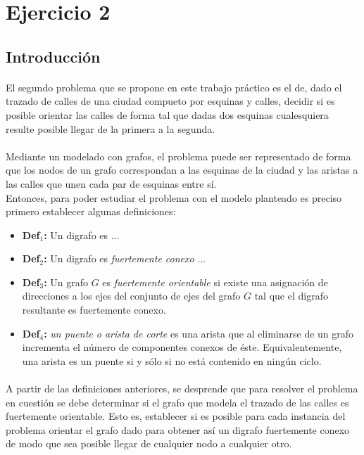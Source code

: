 \section{Ejercicio 2}

\subsection{Introducción}
\label{intro2}

\paragraph{}
El segundo problema que se propone en este trabajo práctico es el de, dado el trazado de calles de una ciudad compueto por esquinas y calles, decidir si es posible orientar las calles de forma tal que dadas dos esquinas cualesquiera resulte posible llegar de la primera a la segunda.

\paragraph{}
Mediante un modelado con grafos, el problema puede ser representado de forma que los nodos de un grafo correspondan a las esquinas de la ciudad y las aristas a las calles que unen cada par de esquinas entre sí. \\
Entonces, para poder estudiar el problema con el modelo planteado es preciso primero establecer algunas definiciones:
\begin{itemize}
	\item \textbf{Def$_1$:} Un digrafo es ...
	\item \textbf{Def$_2$:} Un digrafo es \textit{fuertemente conexo} ...
	\item \textbf{Def$_3$:} Un grafo $G$ es \textit{fuertemente orientable} si existe una asignación de direcciones a los ejes del conjunto de ejes del grafo $G$ tal que el digrafo resultante es fuertemente conexo. 
	\item \textbf{Def$_4$:} \textit{un puente o arista de corte} es una arista que al eliminarse de un grafo incrementa el número de componentes conexos de éste. Equivalentemente, una arista es un puente si y sólo si no está contenido en ningún ciclo.
\end{itemize}

\paragraph{}
A partir de las definiciones anteriores, se desprende que para resolver el problema en cuestión se debe determinar si el grafo que modela el trazado de las calles es fuertemente orientable. Esto es, establecer si es posible para cada instancia del problema orientar el grafo dado para obtener así un digrafo fuertemente conexo de modo que sea posible llegar de cualquier nodo a cualquier otro.

